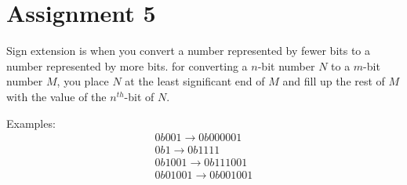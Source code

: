 \section{Assignment 5}
Sign extension is when you convert a number represented by fewer bits to a
number represented by more bits. for converting a $n$-bit number $N$ to a $m$-bit
number $M$, you place $N$ at the least significant end of $M$ and fill up the
rest of $M$ with the value of the $n^{th}$-bit of $N$.

Examples:
\begin{gather*}
0b001 \rightarrow 0b000001\\
0b1 \rightarrow 0b1111\\
0b1001 \rightarrow 0b111001\\
0b01001 \rightarrow 0b001001
\end{gather*}